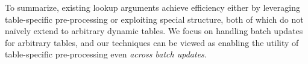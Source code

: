 To summarize, existing lookup arguments achieve efficiency either by leveraging table-specific pre-processing
or exploiting special structure, both of which do not na\"ively extend to arbitrary dynamic tables.
We focus on handling batch updates for arbitrary tables, and our techniques can be viewed as enabling the
utility of table-specific pre-processing even \textit{across batch updates}.

%
%






